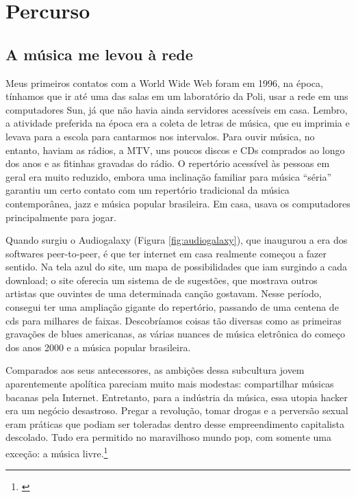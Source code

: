 
\chapter{Percurso}
\label{ch:percurso}


\section{A música me levou à rede}
    
Meus primeiros contatos com a World Wide Web foram em 1996, na época, tínhamos que ir até uma das salas em um laboratório da Poli, usar a rede em uns computadores Sun, já que não havia ainda servidores acessíveis em casa. Lembro, a atividade preferida na época era a coleta de letras de música, que eu imprimia e levava para a escola para cantarmos nos intervalos. Para ouvir música, no entanto, haviam as rádios, a MTV, uns poucos discos e CDs comprados ao longo dos anos e as fitinhas gravadas do rádio. O repertório acessível às pessoas em geral era muito reduzido, embora uma inclinação familiar para música ``séria'' garantiu um certo contato com um repertório tradicional da música contemporânea, jazz e música popular brasileira. Em casa, usava os computadores principalmente para jogar.

Quando surgiu o Audiogalaxy (Figura \ref{fig:audiogalaxy}), que inaugurou a era dos softwares peer-to-peer, é que ter internet em casa realmente começou a fazer sentido. Na tela azul do site, um mapa de possibilidades que iam surgindo a cada download; o site oferecia um sistema de de sugestões, que mostrava outros artistas que ouvintes de uma determinada canção gostavam. Nesse período, consegui ter uma ampliação gigante do repertório, passando de uma centena de cds para milhares de faixas. Descobríamos coisas tão diversas como as primeiras gravações de blues americanas, as várias nuances de música eletrônica do começo dos anos 2000 e a música popular brasileira. 

    
\begin{citacao}
Comparados aos seus antecessores, as ambições dessa subcultura jovem aparentemente apolítica pareciam muito mais modestas: compartilhar músicas bacanas pela Internet. Entretanto, para a indústria da música, essa utopia hacker era um negócio desastroso. Pregar a revolução, tomar drogas e a perversão sexual eram práticas que podiam ser toleradas dentro desse empreendimento capitalista descolado. Tudo era permitido no maravilhoso mundo pop, com somente uma exceção: a música livre.\footnote{\cite[370]{Barbrook2009}}
\end{citacao}

